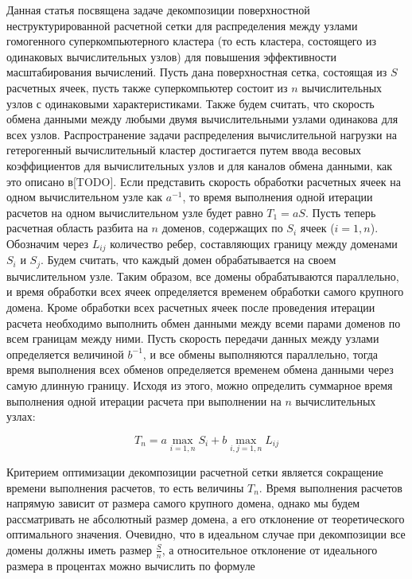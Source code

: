 \documentclass[
11pt,%
tightenlines,%
twoside,%
onecolumn,%
nofloats,%
nobibnotes,%
nofootinbib,%
superscriptaddress,%
noshowpacs,%
centertags]%
{revtex4}
\begin{document}
Данная статья посвящена задаче декомпозиции поверхностной неструктурированной расчетной сетки для распределения между узлами гомогенного суперкомпьютерного кластера (то есть кластера, состоящего из одинаковых вычислительных узлов) для повышения эффективности масштабирования вычислений.
Пусть дана поверхностная сетка, состоящая из $S$ расчетных ячеек, пусть также суперкомпьютер состоит из $n$ вычислительных узлов с одинаковыми характеристиками.
Также будем считать, что скорость обмена данными между любыми двумя вычислительными узлами одинакова для всех узлов.
Распространение задачи распределения вычислительной нагрузки на гетерогенный вычислительный кластер достигается путем ввода весовых коэффициентов для вычислительных узлов и для каналов обмена данными, как это описано в[TODO].
Если представить скорость обработки расчетных ячеек на одном вычислительном узле как $a^{-1}$, то время выполнения одной итерации расчетов на одном вычислительном узле будет равно $T_1 = aS$.
Пусть теперь расчетная область разбита на $n$ доменов, содержащих по $S_i$ ячеек ($i=1,n$).
Обозначим через $L_{ij}$ количество ребер, составляющих границу между доменами $S_i$ и $S_j$.
Будем считать, что каждый домен обрабатывается на своем вычислительном узле.
Таким образом, все домены обрабатываются параллельно, и время обработки всех ячеек определяется временем обработки самого крупного домена.
Кроме обработки всех расчетных ячеек после проведения итерации расчета необходимо выполнить обмен данными между всеми парами доменов по всем границам между ними.
Пусть скорость передачи данных между узлами определяется величиной $b^{-1}$, и все обмены выполняются параллельно, тогда время выполнения всех обменов определяется временем обмена данными через самую длинную границу.
Исходя из этого, можно определить суммарное время выполнения одной итерации расчета при выполнении на $n$ вычислительных узлах:

\begin{equation}
T_n = a \max_{i = 1,n}{S_i} + b \max_{i,j=1,n}{L_{ij}}
\end{equation}

Критерием оптимизации декомпозиции расчетной сетки является сокращение времени выполнения расчетов, то есть величины $T_n$.
Время выполнения расчетов напрямую зависит от размера самого крупного домена, однако мы будем рассматривать не абсолютный размер домена, а его отклонение от теоретического оптимального значения.
Очевидно, что в идеальном случае при декомпозиции все домены должны иметь размер $\frac{S}{n}$, а относительное отклонение от идеального размера в процентах можно вычислить по формуле
\end{document}
